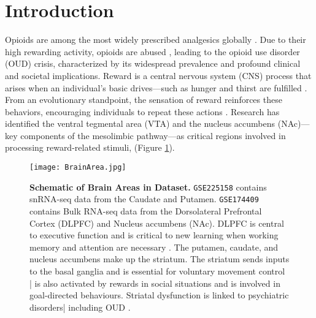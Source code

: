 \documentclass[10pt,letterpaper]{article}
\begin{document}
\linenumbers

\section*{Introduction}

Opioids are among the most widely prescribed analgesics globally \cite{vanAmsterdam2015}. Due to their high rewarding activity, opioids are abused \cite{SAMHSA2018, Seth2018}, leading to the opioid use disorder (OUD) crisis, characterized by its widespread prevalence and profound clinical and societal implications. Reward is a central nervous system (CNS) process that arises when an individual’s basic drives—such as hunger and thirst are fulfilled \cite{Fields2015}. From an evolutionary standpoint, the sensation of reward reinforces these behaviors, encouraging individuals to repeat these actions \cite{Fields2015}. Research has identified the ventral tegmental area (VTA) and the nucleus accumbens (NAc)—key components of the mesolimbic pathway—as critical regions involved in processing reward-related stimuli, \cite{Volkow2015} (Figure \ref{Brain}).

\begin{figure}[ht] %
\texttt{[image: BrainArea.jpg]}
\caption{\color{Gray}\textbf{Schematic of Brain Areas in Dataset. }
\texttt{GSE225158} contains snRNA-seq data from the Caudate and Putamen. \texttt{GSE174409} contains Bulk RNA-seq data from the Dorsolateral Prefrontal Cortex (DLPFC) and Nucleus accumbens (NAc). DLPFC is central to executive function and is critical to new learning when working memory and attention are necessary \cite{ZGALJARDIC2010458}. The putamen, caudate, and nucleus accumbens make up the striatum. The striatum sends inputs to the basal ganglia and is essential for voluntary movement control \cite{Hikosaka2000}| is also activated by rewards in social situations \cite{Baez2013} and is involved in goal-directed behaviours. Striatal dysfunction is linked to psychiatric disorders| including OUD \cite{Phan2024}.
}
\label{Brain} %
\end{figure}
\end{document}
